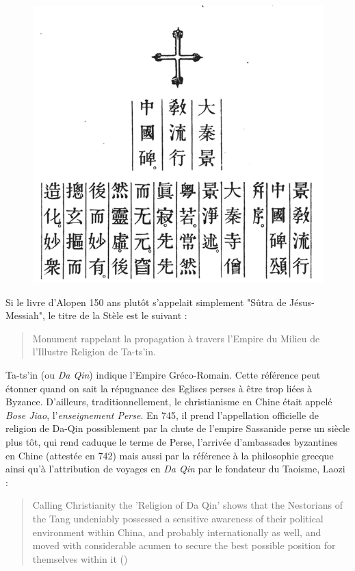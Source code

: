 \begin{figure}[h!]
    \centering
    \includegraphics[width=\textwidth]{ChristologieCultureHistoire/Images/PremierParagrapheStele.png}
 
    \label{fig:my_label}
\end{figure}
 Si le livre d'Alopen 150 ans plutôt s'appelait simplement "Sûtra de Jésus-Messiah", le titre de la Stèle est le suivant :
\begin{quote}
    Monument rappelant la propagation à travers l'Empire du Milieu de l'Illustre Religion de Ta-ts'in. \cite{Havret:stelechretienne}
\end{quote}
Ta-ts'in (ou \emph{Da Qin}) indique l'Empire Gréco-Romain. Cette référence peut étonner quand on sait la répugnance des Eglises perses à être trop liées à Byzance. D'ailleurs, traditionnellement, le christianisme en Chine était appelé \textit{Bose Jiao}, l'\textit{enseignement Perse}.  En 745, il prend l'appellation officielle de religion de Da-Qin  possiblement par la chute de l'empire Sassanide perse un siècle plus tôt, qui rend caduque le terme de Perse, l'arrivée d'ambassades byzantines en Chine (attestée en 742) mais aussi par la référence à la philosophie grecque ainsi qu'à l'attribution de voyages en \textit{Da Qin} par le fondateur du Taoisme, Laozi :
\begin{quote}
    Calling Christianity the 'Religion of Da Qin' shows that the Nestorians of the Tang undeniably possessed a sensitive awareness of their political environment within China, and probably internationally as well, and moved with considerable acumen to secure the best possible position for themselves within it (\cite{Barrett:TaoismChristianity})
\end{quote}

